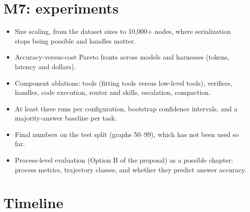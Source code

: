 \section{M7: experiments}

\begin{itemize}
  \item Size scaling, from the dataset sizes to 10,000+ nodes, where serialization stops being possible and handles
        matter.
  \item Accuracy-versus-cost Pareto fronts across models and harnesses (tokens, latency and dollars).
  \item Component ablations: tools (fitting tools versus low-level tools), verifiers, handles, code execution, router
        and skills, escalation, compaction.
  \item At least three runs per configuration, bootstrap confidence intervals, and a majority-answer baseline per task.
  \item Final numbers on the test split (graphs 50--99), which has not been used so far.
  \item Process-level evaluation (Option B of the proposal) as a possible chapter: process metrics, trajectory
        classes, and whether they predict answer accuracy.
\end{itemize}

\section{Timeline}


